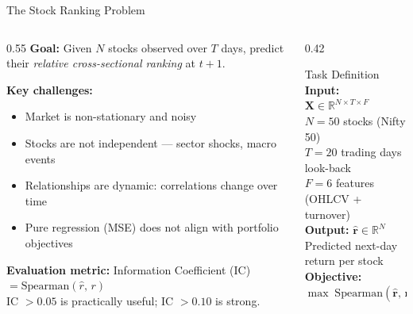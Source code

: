 \documentclass[aspectratio=169, 10pt]{beamer}
\newcommand{\myvec}[1]{\mathbf{#1}}
\begin{document}
\begin{frame}{The Stock Ranking Problem}
  \begin{columns}[T]
    \begin{column}{0.55\textwidth}
      \textbf{Goal:} Given $N$ stocks observed over $T$ days, predict their
      \emph{relative cross-sectional ranking} at $t{+}1$.

      \bigskip
      \textbf{Key challenges:}
      \begin{itemize}
        \item Market is non-stationary and noisy
        \item Stocks are \alert{not independent} — sector shocks, macro events
        \item Relationships are \alert{dynamic}: correlations change over time
        \item Pure regression (MSE) does not align with portfolio objectives
      \end{itemize}

      \bigskip
      \textbf{Evaluation metric:} Information Coefficient (IC) \\
      \quad $= \text{Spearman}(\hat{r},\, r)$\\
      \quad IC $> 0.05$ is practically useful;\; IC $> 0.10$ is strong.
    \end{column}
    \begin{column}{0.42\textwidth}
      \begin{block}{Task Definition}
        \textbf{Input:} $\myvec{X} \in \mathbb{R}^{N \times T \times F}$\\
        \quad $N=50$ stocks (Nifty 50)\\
        \quad $T=20$ trading days look-back\\
        \quad $F=6$ features (OHLCV + turnover)
        \bigskip\\
        \textbf{Output:} $\hat{\myvec{r}} \in \mathbb{R}^{N}$\\
        \quad Predicted next-day return per stock
        \bigskip\\
        \textbf{Objective:}\\
        \quad $\max\;\text{Spearman}(\hat{\myvec{r}},\, \myvec{r}_{t+1})$
      \end{block}
    \end{column}
  \end{columns}
\end{frame}
\end{document}
